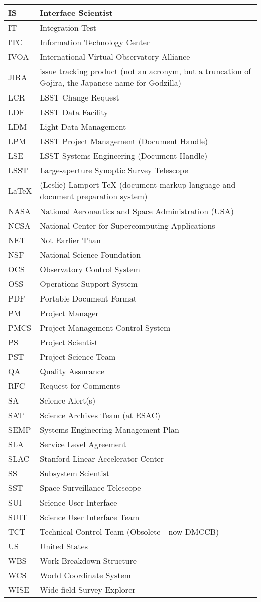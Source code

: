 \begin{longtable}{|l|p{}|}
IS&Interface Scientist \\\hline
IT&Integration Test \\\hline
ITC&Information Technology Center \\\hline
IVOA&International Virtual-Observatory Alliance \\\hline
JIRA&issue tracking product (not an acronym, but a truncation of Gojira, the Japanese name for Godzilla) \\\hline
LCR&LSST Change Request \\\hline
LDF&LSST Data Facility \\\hline
LDM&Light Data Management \\\hline
LPM&LSST Project Management (Document Handle) \\\hline
LSE&LSST Systems Engineering (Document Handle) \\\hline
LSST&Large-aperture Synoptic Survey Telescope \\\hline
LaTeX&(Leslie) Lamport TeX (document markup language and document preparation system) \\\hline
NASA&National Aeronautics and Space Administration (USA) \\\hline
NCSA&National Center for Supercomputing Applications \\\hline
NET&Not Earlier Than \\\hline
NSF&National Science Foundation \\\hline
OCS&Observatory Control System \\\hline
OSS&Operations Support System \\\hline
PDF&Portable Document Format \\\hline
PM&Project Manager \\\hline
PMCS&Project Management Control System \\\hline
PS&Project Scientist \\\hline
PST&Project Science Team \\\hline
QA&Quality Assurance \\\hline
RFC&Request for Comments \\\hline
SA&Science Alert(s) \\\hline
SAT&Science Archives Team (at ESAC) \\\hline
SEMP&Systems Engineering Management Plan \\\hline
SLA&Service Level Agreement \\\hline
SLAC&Stanford Linear Accelerator Center \\\hline
SS&Subsystem Scientist \\\hline
SST&Space Surveillance Telescope \\\hline
SUI&Science User Interface \\\hline
SUIT&Science User Interface Team \\\hline
TCT&Technical Control Team (Obsolete - now DMCCB) \\\hline
US&United States \\\hline
WBS&Work Breakdown Structure \\\hline
WCS&World Coordinate System \\\hline
WISE&Wide-field Survey Explorer \\\hline
\end{longtable}
